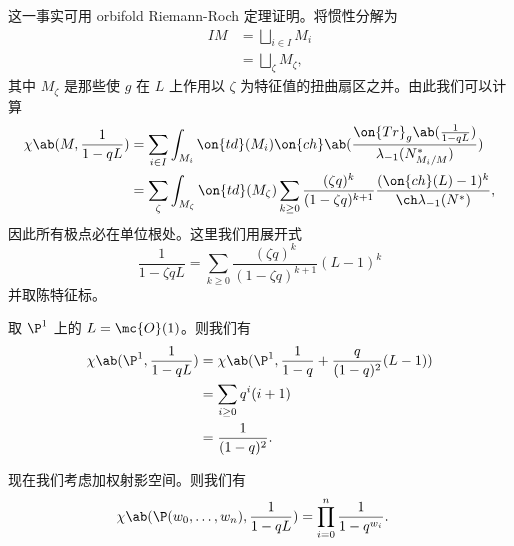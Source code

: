 这一事实可用 orbifold Riemann-Roch 定理证明。将惯性分解为
\begin{align*}
    IM &= \bigsqcup_{i \in I} M_i \\
    &= \bigsqcup_{\zeta} M_{\zeta},
\end{align*}
其中 \(M_{\zeta}\) 是那些使 \(g\) 在 \(L\) 上作用以 \(\zeta\) 为特征值的扭曲扇区之并。由此我们可以计算
\begin{align*}
    \chi\ab(M, \frac{1}{1-qL}) &= \sum_{i \in I} \int_{M_i} \on{td}(M_i) \on{ch} \ab(\frac{ \on{Tr}_g \ab(\frac{1}{1-qL}) }{\lambda_{-1}(N_{M_i/M}^*)}) \\
    &= \sum_{\zeta} \int_{M_{\zeta}} \on{td}(M_{\zeta}) \sum_{k \geq 0} \frac{(\zeta q)^k}{(1-\zeta q)^{k+1}} \frac{( \on{ch}(L)-1 )^k}{\ch \lambda_{-1}(N^*)},
\end{align*}
因此所有极点必在单位根处。这里我们用展开式
\[ \frac{1}{1-\zeta q L} = \sum_{k \geq 0} \frac{(\zeta q)^k}{(1-\zeta q)^{k+1}} (L-1)^k \]
并取陈特征标。

\begin{exm}
    取 \(\P^1\) 上的 \(L = \mc{O}(1)\)。则我们有
    \begin{align*}
        \chi\ab(\P^1, \frac{1}{1-qL}) &= \chi\ab(\P^1, \frac{1}{1-q} + \frac{q}{(1-q)^2}(L-1)) \\
        &= \sum_{i \geq 0} q^i (i+1) \\
        &= \frac{1}{(1-q)^2}.
    \end{align*}
\end{exm}

\begin{exm}
    现在我们考虑加权射影空间。则我们有
    \begin{align*}
        \chi\ab(\P(w_0, \ldots, w_n), \frac{1}{1-qL}) &= \prod_{i=0}^n \frac{1}{1-q^{w_i}}. 
    \end{align*}
\end{exm}

